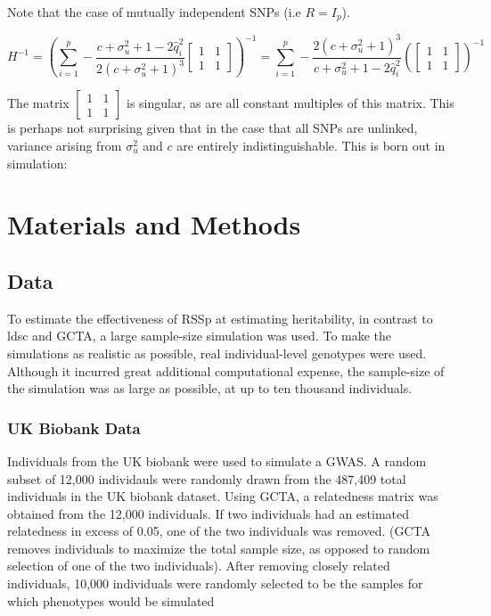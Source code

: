 {Note that the case of mutually independent SNPs (i.e \(R=I_p\)). 

$$H^{-1}=\left(\sum_{i=1}^p - \frac{c +  \sigma_u^2 + 1 - 2 \hat{q}_i^2}{2 (c + \sigma_u^2 + 1)^3}   
\begin{bmatrix} 1 & 1\\ 1 & 1\end{bmatrix}\right)^{-1}=\sum_{i=1}^p - \frac{2 (c + \sigma_u^2 + 1)^3}{c +  \sigma_u^2 + 1 - 2 \hat{q}_i^2}
\left(\begin{bmatrix} 1 & 1\\ 1 & 1\end{bmatrix}\right)^{-1}$$

The matrix \(\begin{bmatrix} 1 & 1\\ 1 & 1\end{bmatrix}\) is singular, as are all constant multiples of this matrix.  This is perhaps not surprising given that in the case that all SNPs are unlinked, variance arising from \(\sigma_u^2\) and \(c\) are entirely indistinguishable.  This is born out in simulation:


\section{Materials and Methods}\label{sec:org762fc74}

\subsection{Data}\label{sec:org079c51d}




To estimate the effectiveness of RSSp at estimating heritability, in contrast to ldsc and GCTA, a large sample-size simulation was used.  To make the simulations as realistic as possible, real individual-level genotypes were used.  Although it incurred great additional
computational expense, the sample-size of the simulation was as large as possible, at up to ten thousand individuals.

\subsubsection{UK Biobank Data}\label{sec:org642e65e}

Individuals from the UK biobank were used to simulate a GWAS.  A random subset of 12,000 individauls were randomly drawn from the 487,409 total individuals in the UK biobank dataset.  Using GCTA, a relatedness matrix was obtained from the 12,000 individuals.
If two individuals had an estimated relatedness in excess of 0.05, one of the two individuals was removed.  (GCTA removes individuals to maximize the total sample size, as opposed to random selection of one of the two individuals).  After removing closely related 
individuals, 10,000 individuals were randomly selected to be the samples for which phenotypes would be simulated



}
